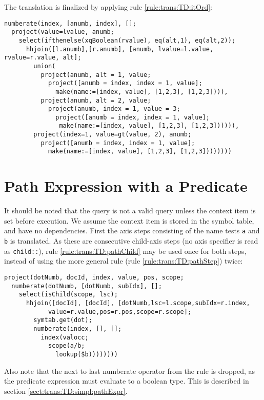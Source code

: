 The translation is finalized by applying rule \ref{rule:trans:TD:itOrd}:

\begin{Verbatim}
numberate(index, [anumb, index], [];
  project(value=lvalue, anumb;
    select(ifthenelse(xqBoolean(rvalue), eq(alt,1), eq(alt,2));
      hhjoin([l.anumb],[r.anumb], [anumb, lvalue=l.value, rvalue=r.value, alt];
        union(
          project(anumb, alt = 1, value;
            project([anumb = index, index = 1, value];
              make(name:=[index, value], [1,2,3], [1,2,3]))),
          project(anumb, alt = 2, value;
            project(anumb, index = 1, value = 3;
              project([anumb = index, index = 1, value];
               make(name:=[index, value], [1,2,3], [1,2,3]))))),
        project(index=1, value=gt(value, 2), anumb;
          project([anumb = index, index = 1, value];
            make(name:=[index, value], [1,2,3], [1,2,3])))))))
\end{Verbatim}

\section{Path Expression with a Predicate}
\label{appendix:transl:pathPred}

It should be noted that the query is not a valid query unless the context item is set before execution. We assume
the context item is stored in the symbol table, and have no dependencies. First the axis steps consisting of the
name tests \texttt{a} and \texttt{b} is translated. As these are consecutive child-axis steps (no axis specifier
is read as \texttt{child::}), rule \ref{rule:trans:TD:pathChild} may be used once for both steps, instead of using
the more general rule (rule \ref{rule:trans:TD:pathStep}) twice:
\begin{Verbatim}
project(dotNumb, docId, index, value, pos, scope;
  numberate(dotNumb, [dotNumb, subIdx], [];
    select(isChild(scope, lsc);
      hhjoin([docId], [docId], [dotNumb,lsc=l.scope,subIdx=r.index,
            value=r.value,pos=r.pos,scope=r.scope];
        symtab.get(dot);
        numberate(index, [], [];
          index(valocc;
            scope(a/b;
              lookup($b))))))))
\end{Verbatim}
Also note that the next to last \textsf{numberate} operator from the rule is dropped, as the predicate expression
must evaluate to a boolean type. This is described in section \ref{sect:trans:TD:simpl:pathExpr}.

